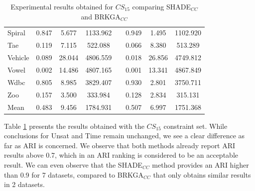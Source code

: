 \documentclass[review]{elsarticle}
\begin{document}
\begin{table}[!h]
{\begin{tabular}{l ccc c ccc}
			Spiral & 0.847 & 5.677 & 1133.962 && 0.949 & 1.495 & 1102.920 \\
			Tae & 0.119 & 7.115 & 522.088 && 0.066 & 8.380 & 513.289 \\
			Vehicle & 0.089 & 28.044 & 4806.559 && 0.018 & 26.856 & 4749.812 \\
			Vowel & 0.002 & 14.486 & 4807.165 && 0.001 & 13.341 & 4867.849 \\
			Wdbc & 0.805 & 8.985 & 3829.407 && 0.930 & 2.801 & 3750.711 \\
			Zoo & 0.157 & 3.500 & 333.984 && 0.128 & 2.834 & 315.131 \\
			\hline
			Mean & 0.483 & 9.456 & 1784.931 && 0.507 & 6.997 & 1751.368 \\
			\hline

		\end{tabular}}

	\caption{Experimental results obtained for $CS_{15}$ comparing SHADE$_{CC}$ and BRKGA$_{CC}$}
	\label{tab:results15}
\end{table}

Table \ref{tab:results15} presents the results obtained with the $CS_{15}$ constraint set. While conclusions for Unsat and Time remain unchanged, we see a clear difference as far as ARI is concerned. We observe that both methods already report ARI results above 0.7, which in an ARI ranking is considered to be an acceptable result. We can even observe that the SHADE$_{CC}$ method provides an ARI higher than 0.9 for 7 datasets, compared to BRKGA$_{CC}$ that only obtains similar results in 2 datasets.
\end{document}
